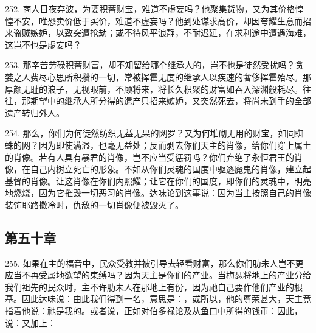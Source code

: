 252. 商人日夜奔波，为要积蓄财宝，难道不虚妄吗？他聚集货物，又为其价格惶惶不安，唯恐卖价低于买价，难道不虚妄吗？他到处谋求高价，却因夸耀生意而招来盗贼嫉妒，以致突遭抢劫；或不待风平浪静，不耐迟延，在求利途中遭遇海难，这岂不也是虚妄吗？\par

253. 那辛苦劳碌积蓄财富，却不知留给哪个继承人的，岂不也是徒然受扰吗？贪婪之人费尽心思所积攒的一切，常被挥霍无度的继承人以疾速的奢侈挥霍殆尽。那厚颜无耻的浪子，无视眼前，不顾将来，将长久积聚的财富如吞入深渊般耗尽。往往，那期望中的继承人所分得的遗产只招来嫉妒，又突然死去，将尚未到手的全部遗产转归外人。\par

254. 那么，你们为何徒然纺织无益无果的网罗？又为何堆砌无用的财宝，如同蜘蛛的网？因为即使满溢，也毫无益处；反而剥去你们天主的肖像，给你们穿上属土的肖像。若有人具有暴君的肖像，岂不应当受惩罚吗？你们弃绝了永恒君王的肖像，在自己内树立死亡的形象。不如从你们灵魂的国度中驱逐魔鬼的肖像，建立起基督的肖像。让这肖像在你们内照耀；让它在你们的国度，即你们的灵魂中，明亮地燃烧，因为它摧毁一切恶习的肖像。达味论到这事说：因为当主按照自己的肖像装饰耶路撒冷时，仇敌的一切肖像便被毁灭了。\par


\subsection{第五十章}

\par

255. 如果在主的福音中，民众受教并被引导去轻看财富，那么你们肋未人岂不更应当不再受属地欲望的束缚吗？因为天主是你们的产业。当梅瑟将地上的产业分给我们祖先的民众时，主不许肋未人在那地上有份，因为祂自己要作他们产业的根基。因此达味说：由此我们得到一名，意思是：，或所以，他的尊荣甚大，天主竟指着他说：祂是我的。或者说，正如对伯多禄论及从鱼口中所得的钱币：因此，说：又加上：\par

